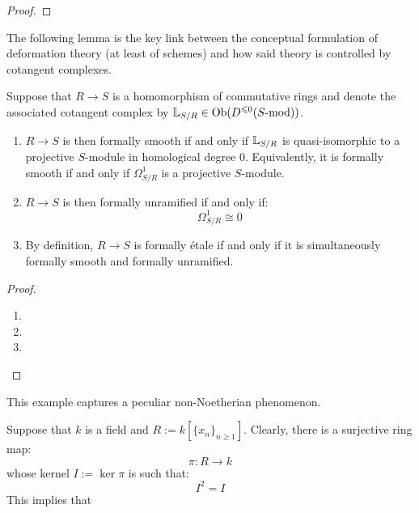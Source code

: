             \begin{lemma}
                
            \end{lemma}
                \begin{proof}
                    
                \end{proof}
            The following lemma is the key link between the conceptual formulation of deformation theory (at least of schemes) and how said theory is controlled by cotangent complexes.
            \begin{lemma} \label{lemma: formally_smooth_unramified_and_etale_morphisms_via_cotangent_complexes}
                Suppose that $R \to S$ is a homomorphism of commutative rings and denote the associated cotangent complex by $\mathbb{L}_{S/R} \in \mathrm{Ob}( D^{\leqslant 0}(S\text{-}\mathrm{mod}) )$. 
                \begin{enumerate}
                    \item $R \to S$ is then formally smooth if and only if $\mathbb{L}_{S/R}$ is quasi-isomorphic to a projective $S$-module in homological degree $0$. Equivalently, it is formally smooth if and only if $\Omega^1_{S/R}$ is a projective $S$-module.
                    \item $R \to S$ is then formally unramified if and only if:
                        $$\Omega^1_{S/R} \cong 0$$
                    \item By definition, $R \to S$ is formally \'etale if and only if it is simultaneously formally smooth and formally unramified. 
                \end{enumerate}
            \end{lemma}
                \begin{proof}
                    \begin{enumerate}
                        \item 
                        \item 
                        \item 
                    \end{enumerate}
                \end{proof}
            \begin{example}
                
            \end{example}
            \begin{example}
                This example captures a peculiar non-Noetherian phenomenon.

                Suppose that $k$ is a field and $R := k[\{x_n\}_{n \geq 1}]$. Clearly, there is a surjective ring map:
                    $$\pi: R \to k$$
                whose kernel $I := \ker \pi$ is such that:
                    $$I^2 = I$$
                This implies that
            \end{example}

